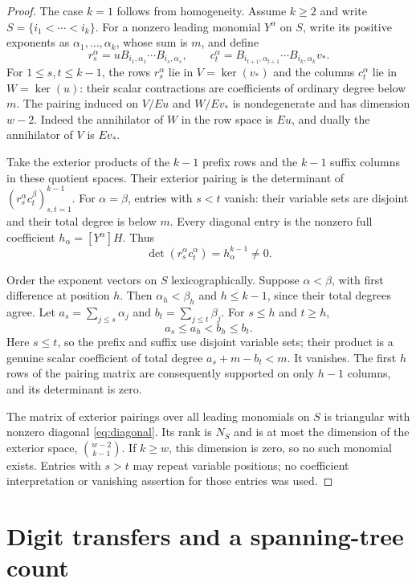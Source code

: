\documentclass[11pt]{article}
\begin{document}
\begin{proof}
The case $k=1$ follows from homogeneity. Assume $k\ge2$ and write
$S=\{i_1<\cdots<i_k\}$. For a nonzero leading monomial $Y^\alpha$
on $S$, write its positive exponents as $\alpha_1,\ldots,\alpha_k$,
whose sum is $m$, and define
\[
 r_s^\alpha=uB_{i_1,\alpha_1}\cdots B_{i_s,\alpha_s},\qquad
 c_t^\alpha=B_{i_{t+1},\alpha_{t+1}}\cdots B_{i_k,\alpha_k}v_* .
\]
For $1\le s,t\le k-1$, the rows $r_s^\alpha$ lie in
$V=\ker(v_*)$ and the columns $c_t^\alpha$ lie in $W=\ker(u)$:
their scalar contractions are coefficients of ordinary degree below
$m$. The pairing induced on $V/Eu$ and $W/Ev_*$ is nondegenerate and
has dimension $w-2$. Indeed the annihilator of $W$ in the row space is
$Eu$, and dually the annihilator of $V$ is $Ev_*$.

Take the exterior products of the $k-1$ prefix rows and the $k-1$
suffix columns in these quotient spaces. Their exterior pairing is
the determinant of $(r_s^\alpha c_t^\beta)_{s,t=1}^{k-1}$.
For $\alpha=\beta$, entries with $s<t$ vanish: their variable sets
are disjoint and their total degree is below $m$. Every diagonal entry
is the nonzero full coefficient $h_\alpha=[Y^\alpha]H$. Thus
\begin{equation}\label{eq:diagonal}
 \det(r_s^\alpha c_t^\alpha)=h_\alpha^{k-1}\ne0.
\end{equation}

Order the exponent vectors on $S$ lexicographically. Suppose
$\alpha<\beta$, with first difference at position $h$. Then
$\alpha_h<\beta_h$ and $h\le k-1$, since their total degrees agree.
Let $a_s=\sum_{j\le s}\alpha_j$ and
$b_t=\sum_{j\le t}\beta_j$. For $s\le h$ and $t\ge h$,
\[
 a_s\le a_h<b_h\le b_t.
\]
Here $s\le t$, so the prefix and suffix use disjoint variable sets;
their product is a genuine scalar coefficient of total degree
$a_s+m-b_t<m$. It vanishes. The first $h$ rows of the pairing matrix
are consequently supported on only $h-1$ columns, and its determinant
is zero.

The matrix of exterior pairings over all leading monomials on $S$ is
triangular with nonzero diagonal \eqref{eq:diagonal}. Its rank is
$N_S$ and is at most the dimension of the exterior space,
$\binom{w-2}{k-1}$. If $k\ge w$, this dimension is zero, so no
such monomial exists. Entries with $s>t$ may repeat variable positions;
no coefficient interpretation or vanishing assertion for those entries
was used.
\end{proof}

\section{Digit transfers and a spanning-tree count}
\end{document}
